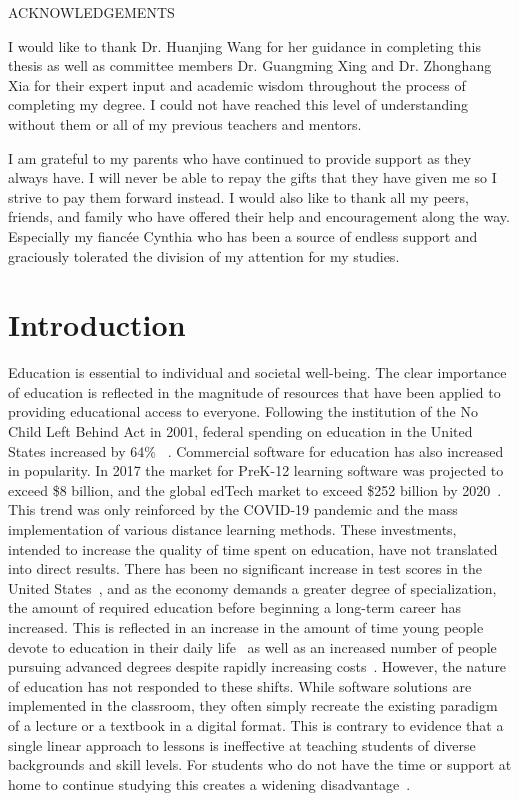 \documentclass[letterpaper, 12pt, captions=tableabove]{scrreprt}
\begin{document}
\begin{center}
	ACKNOWLEDGEMENTS \\
\end{center}

	I would like to thank Dr. Huanjing Wang for her guidance in completing this thesis as well as committee members Dr. Guangming Xing and Dr. Zhonghang Xia for their expert input and academic wisdom throughout the process of completing my degree. I could not have reached this level of understanding without them or all of my previous teachers and mentors.\par
	I am grateful to my parents who have continued to provide support as they always have. I will never be able to repay the gifts that they have given me so I strive to pay them forward instead.
	I would also like to thank all my peers, friends, and family who have offered their help and encouragement along the way. Especially my fianc\'ee Cynthia who has been a source of endless support and graciously tolerated the division of my attention for my studies.
	

\tableofcontents
\listoftables
\listoffigures


\chapter{Introduction}
\label{ch:intro}

	Education is essential to individual and societal well-being. The clear importance of education is reflected in the magnitude of resources that have been applied to providing educational access to everyone. Following the institution of the No Child Left Behind Act in 2001, federal spending on education in the United States increased by 64\% ~\cite{bolden2020}.  Commercial software for education has also increased in popularity. In 2017 the market for PreK-12 learning software was projected to exceed \$8 billion, and the global edTech market to exceed  \$252 billion by 2020~\cite{escueta2017}. This trend was only reinforced by the COVID-19 pandemic and the mass implementation of various distance learning methods. These investments, intended to increase the quality of time spent on education, have not translated into direct results. There has been no significant increase in test scores in the United States~\cite{bolden2020}, and as the economy demands a greater degree of specialization, the amount of required education before beginning a long-term career has increased.  This is reflected in an increase in the amount of time young people devote to education in their daily life~\cite{livingston2019} as well as an increased number of people pursuing advanced degrees despite rapidly increasing costs~\cite{ryan2016}. However, the nature of education has not responded to these shifts. While software solutions are implemented in the classroom, they often simply recreate the existing paradigm of a lecture or a textbook in a digital format. This is contrary to evidence that a single linear approach to lessons is ineffective at teaching students of diverse backgrounds and skill levels. For students who do not have the time or support at home to continue studying this creates a widening disadvantage~\cite{escueta2017}.
\end{document}
